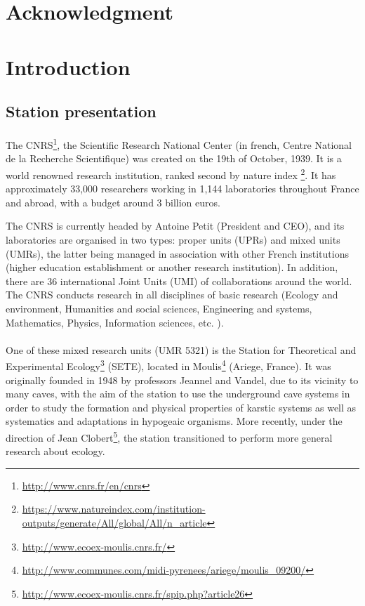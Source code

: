 \documentclass{article}
\begin{document}
\newpage
\section*{Acknowledgment}



\newpage
{}
\section*{Introduction}

\subsection*{Station presentation}

\paragraph{}
The CNRS\footnote{\url{http://www.cnrs.fr/en/cnrs}}, the Scientific Research National Center (in french, Centre National de la Recherche Scientifique) was created on the 19th of October, 1939. It is a world renowned research institution, ranked second by  nature index \footnote{\url{https://www.natureindex.com/institution-outputs/generate/All/global/All/n_article}}. It has approximately 33,000 researchers working in 1,144 laboratories throughout France and abroad, with a budget around 3 billion euros. 

The CNRS is currently headed by Antoine Petit (President and CEO), and its laboratories are organised in two types: proper units (UPRs) and mixed units (UMRs), the latter being managed in association with other French institutions (higher education establishment or another research institution). In addition, there are 36 international Joint Units (UMI) of collaborations around the world. The CNRS conducts research in all disciplines of basic research (Ecology and environment, Humanities and social sciences, Engineering and systems, Mathematics, Physics, Information sciences, etc. ).


\paragraph{}
One of these mixed research units (UMR 5321) is the Station for Theoretical and Experimental Ecology\footnote{\url{http://www.ecoex-moulis.cnrs.fr/}} (SETE), located in Moulis\footnote{\url{http://www.communes.com/midi-pyrenees/ariege/moulis_09200/}} (Ariege, France). It was originally founded in 1948 by professors Jeannel and Vandel, due to its vicinity to many caves, with the aim of the station to use the underground cave systems in order to study the formation and physical properties of karstic systems as well as systematics and adaptations in hypogeaic organisms. More recently, under the direction of Jean Clobert\footnote{\url{http://www.ecoex-moulis.cnrs.fr/spip.php?article26}}, the station transitioned to perform more general research about ecology.
\end{document}
